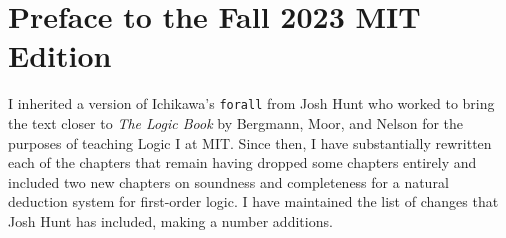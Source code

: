 
\chapter*{Preface to the Fall 2023 MIT Edition}
\label{ch.preface2}

I inherited a version of Ichikawa's {\tt forall} from Josh Hunt who worked to bring the text closer to \textit{The Logic Book} by Bergmann, Moor, and Nelson for the purposes of teaching Logic I at MIT.
Since then, I have substantially rewritten each of the chapters that remain having dropped some chapters entirely and included two new chapters on soundness and completeness for a natural deduction system for first-order logic.
I have maintained the list of changes that Josh Hunt has included, making a number additions.

